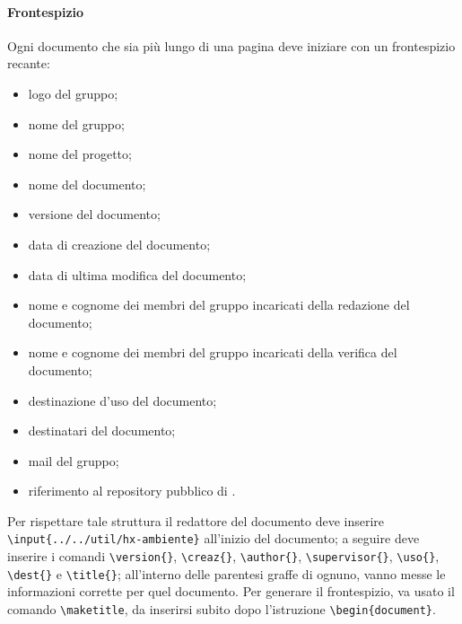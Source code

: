 \paragraph{Frontespizio} Ogni documento che sia più lungo di una pagina deve iniziare con un frontespizio recante:
\begin{itemize}
	\item logo del gruppo;
	\item nome del gruppo;
	\item nome del progetto;
	\item nome del documento;
	\item versione del documento;
	\item data di creazione del documento;
	\item data di ultima modifica del documento;
	\item nome e cognome dei membri del gruppo incaricati della redazione del documento;
	\item nome e cognome dei membri del gruppo incaricati della verifica del documento;
	\item destinazione d'uso del documento;
	\item destinatari del documento;
	\item mail del gruppo;
	\item riferimento al repository pubblico di .
\end{itemize} 
Per rispettare tale struttura il redattore del documento deve inserire \\\texttt{\textbackslash input\{../../util/hx-ambiente\}} all'inizio del documento; a seguire deve inserire i comandi \texttt{\textbackslash version\{\}}, \texttt{\textbackslash creaz\{\}}, \texttt{\textbackslash author\{\}}, \texttt{\textbackslash supervisor\{\}}, \texttt{\textbackslash uso\{\}}, \texttt{\textbackslash dest\{\}} e \texttt{\textbackslash title\{\}}; all'interno delle parentesi graffe di ognuno, vanno messe le informazioni corrette per quel documento. Per generare il frontespizio, va usato il comando \texttt{\textbackslash maketitle}, da inserirsi subito dopo l'istruzione \texttt{\textbackslash begin\{document\}}.
